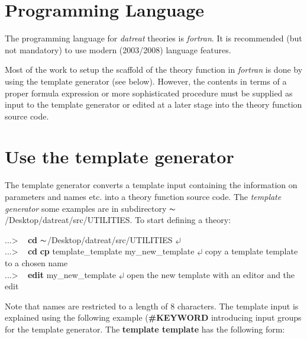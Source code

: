 \documentclass[11pt,fleqn]{book} %
\newcommand{\return}{$\carriagereturn$} %
\newcommand{\sysprompt}{{\color{green}...\textgreater} ~ }
\newcommand{\home}{${\thicksim}$/Desktop}
\newcommand{\enter}[1]{{\color{red} \bf #1}}
\newcommand{\expl}[1]{\hskip 0.5cm {\color{explgray} #1}}
\begin{document}
\section{Programming Language}
\label{sec:proglang}

The programming language for \emph{datreat} theories is \emph{fortran}.
It is recommended (but not mandatory) to use modern (2003/2008) language features.

Most of the work to setup the scaffold of the theory function in \emph{fortran} is done by using the
template generator (see below). 
However, the contents in terms of a proper formula expression or more sophisticated 
procedure must be supplied as input to the template generator or edited at a later stage
into the theory function source code. 

\section{Use the template generator}
\label{sec:template}

The template generator converts a template input containing the information on 
parameters and names etc. into a theory function source code.
The \emph{template generator} some examples are in subdirectory \home/datreat/src/UTILITIES.
To start defining a theory:  
\begin{corollary}
\sysprompt {\bf cd} \home/datreat/src/UTILITIES  \return  \\
\sysprompt {\bf cd} {\bf cp} template\_template my\_new\_template  \return \expl{copy a template template to a chosen name}  \\
\sysprompt {\bf edit} my\_new\_template  \return \expl{open the new template with an editor and the edit}  \\
\end{corollary}

Note that names are restricted to a length of 8 characters.
The template input is explained using the following example
({\bf \#KEYWORD} introducing input groups for the template generator.
The {\bf template template} has the following form:
\end{document}
